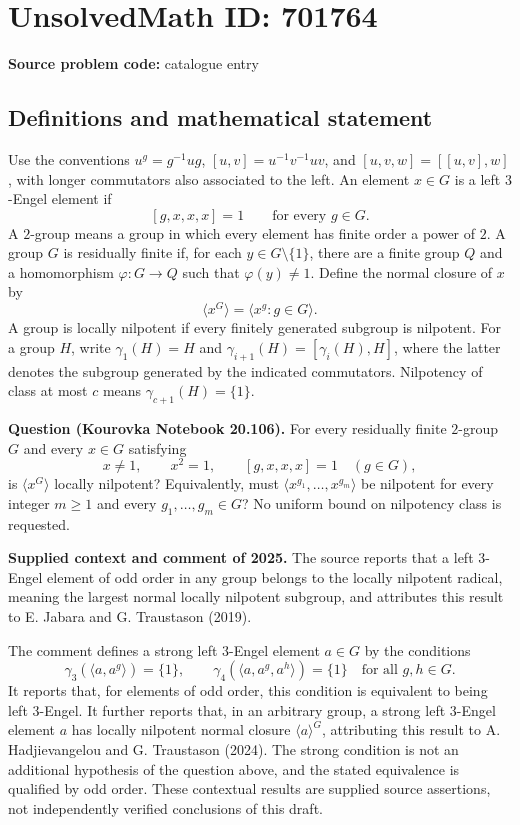 \documentclass[11pt]{article}
\begin{document}
\section*{UnsolvedMath ID: 701764}
\textbf{Source problem code:} catalogue entry
\subsection{Definitions and mathematical statement}
Use the conventions \(u^{g}=g^{-1}ug\), \([u,v]=u^{-1}v^{-1}uv\), and \([u,v,w]=[[u,v],w]\), with longer commutators also associated to the left. An element \(x\in G\) is a left \(3\)-Engel element if
\[
[g,x,x,x]=1\qquad\text{for every }g\in G.
\]
A \(2\)-group means a group in which every element has finite order a power of \(2\). A group \(G\) is residually finite if, for each \(y\in G\setminus\{1\}\), there are a finite group \(Q\) and a homomorphism \(\varphi:G\to Q\) such that \(\varphi(y)\ne1\). Define the normal closure of \(x\) by
\[
\langle x^{G}\rangle=\langle x^{g}:g\in G\rangle.
\]
A group is locally nilpotent if every finitely generated subgroup is nilpotent. For a group \(H\), write \(\gamma _1(H)=H\) and \(\gamma _{i+1}(H)=[\gamma_i(H),H]\), where the latter denotes the subgroup generated by the indicated commutators. Nilpotency of class at most \(c\) means \(\gamma_{c+1}(H)=\{1\}\).

\textbf{Question (Kourovka Notebook 20.106).} For every residually finite \(2\)-group \(G\) and every \(x\in G\) satisfying
\[
x\ne1,\qquad x^2=1,\qquad [g,x,x,x]=1\quad(g\in G),
\]
is \(\langle x^{G}\rangle\) locally nilpotent? Equivalently, must \(\langle x^{g_1},\ldots,x^{g_m}\rangle\) be nilpotent for every integer \(m\ge1\) and every \(g_1,\ldots,g_m\in G\)? No uniform bound on nilpotency class is requested.

\textbf{Supplied context and comment of 2025.} The source reports that a left \(3\)-Engel element of odd order in any group belongs to the locally nilpotent radical, meaning the largest normal locally nilpotent subgroup, and attributes this result to E. Jabara and G. Traustason (2019).

The comment defines a strong left \(3\)-Engel element \(a\in G\) by the conditions
\[
\gamma_3(\langle a,a^g\rangle)=\{1\},\qquad
\gamma_4(\langle a,a^g,a^h\rangle)=\{1\}
\quad\text{for all }g,h\in G.
\]
It reports that, for elements of odd order, this condition is equivalent to being left \(3\)-Engel. It further reports that, in an arbitrary group, a strong left \(3\)-Engel element \(a\) has locally nilpotent normal closure \(\langle a\rangle^G\), attributing this result to A. Hadjievangelou and G. Traustason (2024). The strong condition is not an additional hypothesis of the question above, and the stated equivalence is qualified by odd order. These contextual results are supplied source assertions, not independently verified conclusions of this draft.
\end{document}
